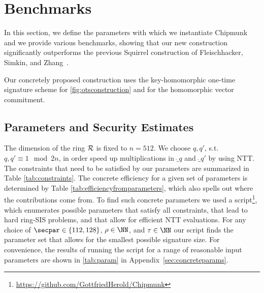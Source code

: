 \section{Benchmarks}\label{sec:benchmarks}


In this section, we define the parameters with which we instantiate Chipmunk and we provide various benchmarks, showing that our new construction significantly outperforms the previous Squirrel construction of Fleischhacker, Simkin, and Zhang~\cite{CCS:FleSimZha22}.

Our concretely proposed construction uses the key-homomorphic one-time signature scheme for \autoref{fig:otsconstruction} and \eprint{$\hvcencoded$}\cameraready{$\hvccamera$} for the homomorphic vector commitment.

\subsection{Parameters and Security Estimates}
The dimension of the ring $\mathcal{R}$ is fixed to $n=512$. We choose $q,q'$, s.t.\ $q,q'\equiv 1\mod 2n$, in order speed up multiplications in $\ring_q$ and $\ring_{q'}$ by using NTT.
The constraints that need to be satisfied by our parameters are summarized in Table \ref{tab:constraints}.
The concrete efficiency for a given set of parameters is determined by Table \ref{tab:efficiencyfromparameters}, which also spells out where the contributions come from.
To find such concrete parameters we used a script\footnote{\label{fn:github}\url{https://github.com/GottfriedHerold/Chipmunk}}, which enumerates possible parameters that satisfy all constraints, that lead to hard ring-SIS problems, and that allow for efficient NTT evaluations.
For any choice of $\secpar\in\{112,128\}$, $\rho\in\NN$, and $\tau\in\NN$ our script finds the parameter set that allows for the smallest possible signature size.
For convenience, the results of running the script for a range of reasonable input parameters are shown in \autoref{tab:param} in Appendix~\ref{sec:concreteparams}.%

